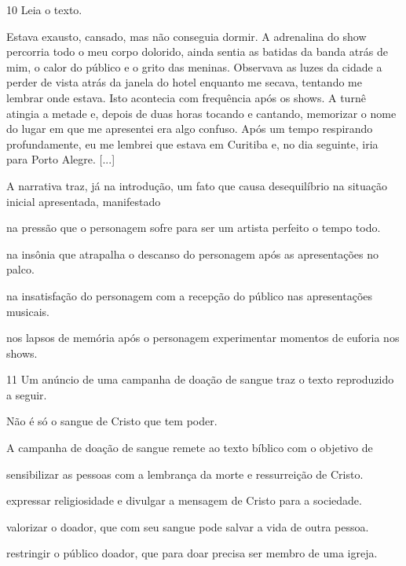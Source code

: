 \num{10} Leia o texto.

\begin{myquote}
Estava exausto, cansado, mas não conseguia dormir. A adrenalina do show
percorria todo o meu corpo dolorido, ainda sentia as batidas da banda
atrás de mim, o calor do público e o grito das meninas. Observava as
luzes da cidade a perder de vista atrás da janela do hotel enquanto me
secava, tentando me lembrar onde estava. Isto acontecia com frequência
após os shows. A turnê atingia a metade e, depois de duas horas tocando
e cantando, memorizar o nome do lugar em que me apresentei era algo
confuso. Após um tempo respirando profundamente, eu me lembrei que
estava em Curitiba e, no dia seguinte, iria para Porto Alegre. {[}...{]}

\end{myquote}

A narrativa traz, já na introdução, um fato que causa desequilíbrio na
situação inicial apresentada, manifestado

\begin{escolha}
\item na pressão que o personagem sofre para ser um artista perfeito o
tempo todo.

\item na insônia que atrapalha o descanso do personagem após as
apresentações no palco.

\item na insatisfação do personagem com a recepção do público nas
apresentações musicais.

\item nos lapsos de memória após o personagem experimentar momentos de
euforia nos shows.
\end{escolha}

\pagebreak

\num{11} Um anúncio de uma campanha de doação de sangue traz o texto reproduzido a seguir.

\begin{myquote}
\centering Não é só o sangue de Cristo que tem poder.
\end{myquote}

A campanha de doação de sangue remete ao texto bíblico com o objetivo de

\begin{escolha}
\item sensibilizar as pessoas com a lembrança da morte e ressurreição de
Cristo.
\item expressar religiosidade e divulgar a mensagem de Cristo para a sociedade.
\item valorizar o doador, que com seu sangue pode salvar a vida de outra pessoa.
\item restringir o público doador, que para doar precisa ser membro de uma igreja.
\end{escolha}

